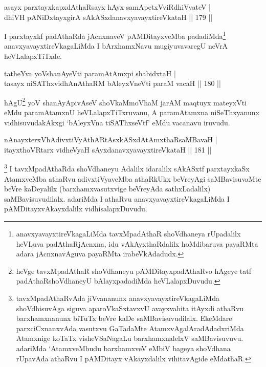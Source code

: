 
\begin{shl}
asayx parxtayxkapxdAthaRsayx hAyx samApetxVviRdhiVyateV |\\
dhiVH pANiDxtayxgirA sAkASxdanavxyavayxtireVkataH \hfill || 179 ||
\end{shl}

\begin{artha}
I parxtayxkf padAthaRda jAcnxnaveV pAMDitayxveMba padadiMda\footnote{anavxyavayxtireVkagaLiMda tavxMpadAthaR shoVdhaneya rUpadalilx heVLuva padAthaRjAcnxna, idu vAkAyxthaRdalilx hoMdibaruva payaRMta adara jAcnxnavAguva payaRMta irabeVkAdadudx.} anavxyavayxtireVkagaLiMda I bArxhamxNavu mugiyuvavaregU neVrA heVLalapxTiTxde.
\end{artha}


\begin{shl}
tatheYva yoV\s shanAyeVti paramAtAmx\s pi shabidxtaH |\\
tasayx niSAThxvidhAnAthaRM bAleyxVneVti paraM vacaH \hfill || 180 ||
\end{shl}

\begin{artha}
hAgU\footnote{heVge tavxMpadAthaR shoVdhaneyu pAMDitayxpadAthaRvo hAgeye tatf padAthaRshoVdhaneyU bAlayxpadadiMda heVLalapxDuvudu.} yoV shanAyApivAseV shoVkaMmoVhaM jarAM maqtuyx mateyxVti eMdu paramAtamxnU heVLalapxTiTxruvanu, A paramAtamxna niSeThxyanunx vidhisuvudakAkxgi `bAleyxVna tiSAThxseVtf' eMdu vacanavu iruvudu.
\end{artha}

\begin{shl}
nAnayxterxVhAdivxtiVyAthARtAsxkASxdAtAmxthaRsaMBavaH |\\
itayxthoVR\s tarx vidheVyaH sAyxdanavxyavayxtireVkataH \hfill || 181 ||
\end{shl}

\begin{artha}%
\footnote{tavxMpadAthaRvAda jiVvananunx anavxyavayxtireVkagaLiMda shoVdhisuvAga siguva aparoVkaSxtavxvU avayxvahita itAyxdi athaRvu barxhamxnanunx biTuTx beVre kaDe saMBavisuvudilalx. EkeMdare parxciCxnanxvAda vasutxvu GaTadaMte AtamxvAgalAradAdadxriMda Atamxnige koTaTx visheVSaNagaLu barxhamxnalelxV saMBavisuvuvu. adariMda `AtamxveMbudu barxhamxveV eMbiV bageya shoVdhana rUpavAda athaRvu I pAMDitayx vAkayxdalilx vihitavAgide eMdathaR.} I tavxMpadAthaRda shoVdhaneyu Adalilx idaralilx sAkASxtf parxtayxkaSx AtamxveMba athaRvu adivxtiVyaveMba athaRkUkx beVreyAgi saMBavisuvaMte beVre kaDeyalilx (barxhamxvasutxvige beVreyAda sathxLadalilx) saMBavisuvudilalx. adariMda I athaRvu anavxyavayxtireVkagaLiMda I pAMDitayxvAkayxdalilx vidhisalapxDuvudu.
\end{artha}

